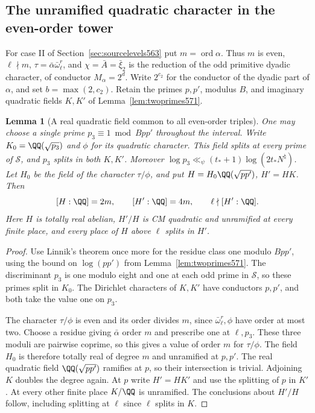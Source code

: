 \documentclass[a4paper,11pt]{article}
\newtheorem{lemma}[proposition]{Lemma}
\theoremstyle{definition}
\theoremstyle{remark}
\numberwithin{equation}{section}
\begin{document}
\subsection{The unramified quadratic character in the even-order tower}
\label{sec:eventower572}

For case II of Section~\ref{sec:sourcelevels563} put
\(m=\operatorname{ord}\alpha\). Thus \(m\) is even,
\(\ell\nmid m\), \(\tau=\bar\alpha\bar\omega_\ell^r\), and
\(\chi=\bar A=\bar\xi_2\) is the reduction of the odd
primitive dyadic character, of conductor \(M_\alpha=2^d\).
Write \(2^{c_2}\) for the conductor of the dyadic part
of \(\alpha\), and set \(b=\max(2,c_2)\).
Retain the primes \(p,p'\), modulus \(B\), and imaginary
quadratic fields \(K,K'\) of Lemma~\ref{lem:twoprimes571}.

\begin{lemma}[A real quadratic field common to all even-order triples]
\leavevmode\label{lem:realquadratic572}
One may choose a single prime \(p_3\equiv1\bmod Bpp'\)
throughout the interval. Write \(K_0=\QQ(\sqrt{p_3})\)
and \(\phi\) for its quadratic character. This field
splits at every prime of \(\mathcal S\), and \(p_3\)
splits in both \(K,K'\). Moreover
\(\log p_3\ll_\psi(t_*+1)\log(2t_*N^\natural)\).
Let \(H_0\) be the field of the character \(\tau/\phi\), and
put \(H=H_0\QQ(\sqrt{pp'})\), \(H'=HK\). Then
\[
   [H:\QQ]=2m,\qquad [H':\QQ]=4m,\qquad
                        \ell\nmid [H':\QQ] .
\]
Here \(H\) is totally real abelian, \(H'/H\) is CM
quadratic and unramified at every finite place, and every
place of \(H\) above \(\ell\) splits in \(H'\).
\end{lemma}
\begin{proof}
Use Linnik's theorem once more for the residue class one
modulo \(Bpp'\), using the bound on \(\log(pp')\) from
Lemma~\ref{lem:twoprimes571}. The discriminant \(p_3\)
is one modulo eight and one at each odd prime in
\(\mathcal S\), so these primes split in \(K_0\).
The Dirichlet characters of \(K,K'\) have conductors
\(p,p'\), and both take the value one on \(p_3\).

The character \(\tau/\phi\) is even and its order divides
\(m\), since \(\bar\omega_\ell^r,\phi\) have order at most
two. Choose a residue giving \(\bar\alpha\) order \(m\)
and prescribe one at \(\ell,p_3\). These three moduli
are pairwise coprime, so this gives a value of order \(m\)
for \(\tau/\phi\). The field \(H_0\) is therefore totally
real of degree \(m\) and unramified at \(p,p'\).
The real quadratic field \(\QQ(\sqrt{pp'})\) ramifies at
\(p\), so their intersection is trivial. Adjoining \(K\)
doubles the degree again. At \(p\) write \(H'=HK'\) and
use the splitting of \(p\) in \(K'\). At every other finite
place \(K/\QQ\) is unramified. The conclusions about \(H'/H\)
follow, including splitting at \(\ell\) since \(\ell\) splits
in \(K\).
\end{proof}
\end{document}
